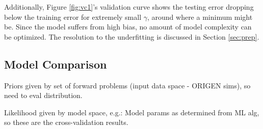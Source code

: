 Additionally, Figure \ref{fig:vc1}'s validation curve shows the testing error
dropping below the training error for extremely small $\gamma$, around where a
minimum might be.  Since the model suffers from high bias, no amount of model
complexity can be optimized. The resolution to the underfitting is discussed in
Section \ref{sec:prep}.

\subsection{Model Comparison}
\label{sec:algcompare}

Priors given by set of forward problems (input data space - ORIGEN sims), so
need to eval distribution.

Likelihood given by model space, e.g.: Model params as determined from ML alg,
so these are the cross-validation results.


